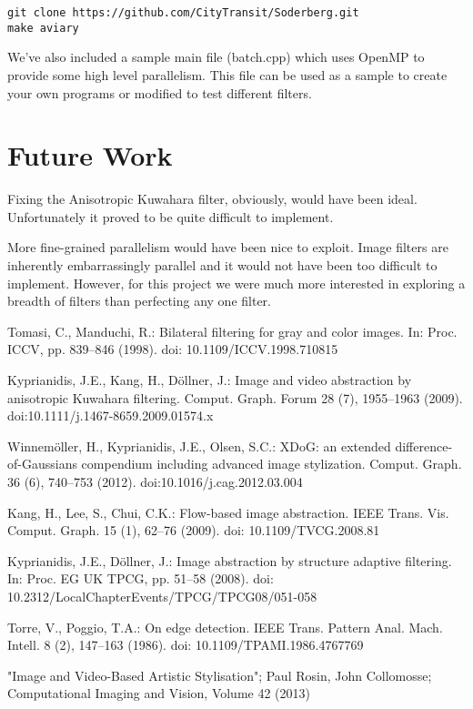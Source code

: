 \documentclass[10pt]{article}
\begin{document}
\begin{verbatim}
git clone https://github.com/CityTransit/Soderberg.git
make aviary
\end{verbatim}

We've also included a sample main file (batch.cpp) which uses OpenMP to provide some high level parallelism. This file can be used as a sample to create your own programs or modified to test different filters.

\section{Future Work}
Fixing the Anisotropic Kuwahara filter, obviously, would have been ideal. Unfortunately it proved to be quite difficult to implement.

More fine-grained parallelism would have been nice to exploit. Image filters are inherently embarrassingly parallel and it would not have been too difficult to implement. However, for this project we were much more interested in exploring a breadth of filters than perfecting any one filter.

\begin{thebibliography}{99} %

Tomasi, C., Manduchi, R.: Bilateral filtering for gray and color images. In: Proc. ICCV, pp. 839–846 (1998). doi: 10.1109/ICCV.1998.710815

Kyprianidis, J.E., Kang, H., Döllner, J.: Image and video abstraction by anisotropic Kuwahara filtering. Comput. Graph. Forum 28 (7), 1955–1963 (2009). doi:10.1111/j.1467-8659.2009.01574.x

Winnemöller, H., Kyprianidis, J.E., Olsen, S.C.: XDoG: an extended difference-of-Gaussians compendium including advanced image stylization. Comput. Graph. 36 (6), 740–753 (2012). doi:10.1016/j.cag.2012.03.004

Kang, H., Lee, S., Chui, C.K.: Flow-based image abstraction. IEEE Trans. Vis. Comput. Graph. 15 (1), 62–76 (2009). doi: 10.1109/TVCG.2008.81

Kyprianidis, J.E., Döllner, J.: Image abstraction by structure adaptive filtering. In: Proc. EG UK TPCG, pp. 51–58 (2008). doi: 10.2312/LocalChapterEvents/TPCG/TPCG08/051-058

Torre, V., Poggio, T.A.: On edge detection. IEEE Trans. Pattern Anal. Mach. Intell. 8 (2), 147–163 (1986). doi: 10.1109/TPAMI.1986.4767769

"Image and Video-Based Artistic Stylisation"; Paul Rosin, John Collomosse; Computational Imaging and Vision, Volume 42 (2013)


\end{thebibliography}
\end{document}
